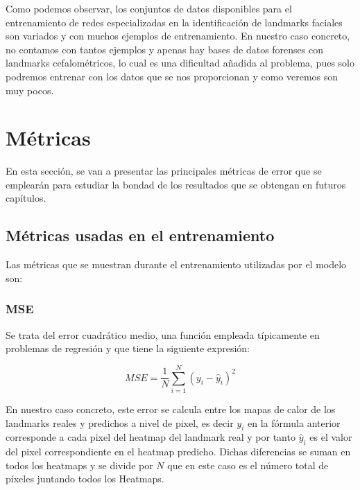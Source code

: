             \medskip

            \noindent Como podemos observar, los conjuntos de datos disponibles para el entrenamiento de redes especializadas en la identificación de landmarks faciales son variados y con muchos ejemplos de entrenamiento. En nuestro caso concreto, no contamos con tantos ejemplos y apenas hay bases de datos forenses con landmarks cefalométricos, lo cual es una dificultad añadida al problema, pues solo podremos entrenar con los datos que se nos proporcionan y como veremos son muy pocos.

\section{Métricas}

\noindent En esta sección, se van a presentar las principales métricas de error que se emplearán para estudiar la bondad de los resultados que se obtengan en futuros capítulos.

    \subsection{Métricas usadas en el entrenamiento}
        \noindent Las métricas que se muestran durante el entrenamiento utilizadas por el modelo son:

        \subsubsection{MSE}
            \noindent Se trata del error cuadrático medio, una función empleada típicamente en problemas de regresión y que tiene la siguiente expresión: 

            \begin{equation}
                MSE = \frac{1}{N} \sum_{i=1}^{N} (y_i - \widehat{y}_i)^2
            \end{equation}

            \noindent En nuestro caso concreto, este error se calcula entre los mapas de calor de los landmarks reales y predichos a nivel de pixel, es decir $y_i$ en la fórmula anterior corresponde a cada pixel del heatmap del landmark real y por tanto $\widehat{y}_i$ es el valor del pixel correspondiente en el heatmap predicho. Dichas diferencias se suman en todos los heatmaps y se divide por $N$ que en este caso es el número total de píxeles juntando todos los Heatmaps.

            \medskip

